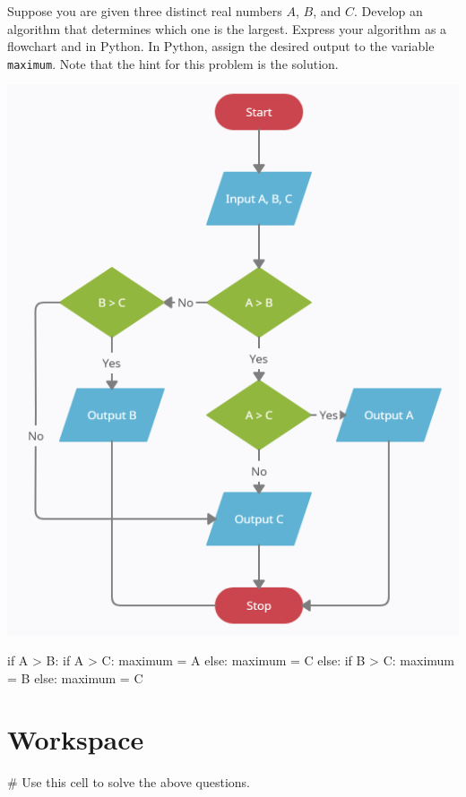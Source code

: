\documentclass{ximera}
\begin{document}
\begin{question}
	Suppose you are given three distinct real numbers $A$, $B$, and $C$. Develop an algorithm that determines which one is the largest. Express your algorithm as a flowchart and in Python. In Python, assign the desired output to the variable \verb|maximum|. Note that the hint for this problem is the solution.
	\begin{hint}
		\begin{center}
			\includegraphics{maxof3.png}
		\end{center}
\begin{sageCell}
if A > B:
        if A > C:
                maximum = A
        else:
                maximum = C
else:
        if B > C:
                maximum = B
        else:
                maximum = C
\end{sageCell}
	\end{hint}
\end{question}

\section{Workspace}

\begin{sageCell}
# Use this cell to solve the above questions.
\end{sageCell}
\end{document}
